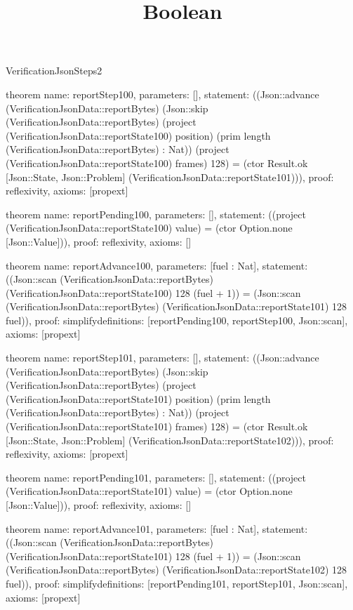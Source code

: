 \begin{lexlean}{VerificationJsonSteps2}
\title{Boolean}
\begin{semanticmodule}

theorem{
  name: reportStep100,
  parameters: [],
  statement: ((Json::advance (VerificationJsonData::reportBytes) (Json::skip (VerificationJsonData::reportBytes) (project (VerificationJsonData::reportState100) position) (prim length (VerificationJsonData::reportBytes) : Nat)) (project (VerificationJsonData::reportState100) frames) 128) = (ctor Result.ok [Json::State, Json::Problem] (VerificationJsonData::reportState101))),
  proof: reflexivity{},
  axioms: [propext]
}

theorem{
  name: reportPending100,
  parameters: [],
  statement: ((project (VerificationJsonData::reportState100) value) = (ctor Option.none [Json::Value])),
  proof: reflexivity{},
  axioms: []
}

theorem{
  name: reportAdvance100,
  parameters: [fuel : Nat],
  statement: ((Json::scan (VerificationJsonData::reportBytes) (VerificationJsonData::reportState100) 128 (fuel + 1)) = (Json::scan (VerificationJsonData::reportBytes) (VerificationJsonData::reportState101) 128 fuel)),
  proof: simplify{definitions: [reportPending100, reportStep100, Json::scan]},
  axioms: [propext]
}

theorem{
  name: reportStep101,
  parameters: [],
  statement: ((Json::advance (VerificationJsonData::reportBytes) (Json::skip (VerificationJsonData::reportBytes) (project (VerificationJsonData::reportState101) position) (prim length (VerificationJsonData::reportBytes) : Nat)) (project (VerificationJsonData::reportState101) frames) 128) = (ctor Result.ok [Json::State, Json::Problem] (VerificationJsonData::reportState102))),
  proof: reflexivity{},
  axioms: [propext]
}

theorem{
  name: reportPending101,
  parameters: [],
  statement: ((project (VerificationJsonData::reportState101) value) = (ctor Option.none [Json::Value])),
  proof: reflexivity{},
  axioms: []
}

theorem{
  name: reportAdvance101,
  parameters: [fuel : Nat],
  statement: ((Json::scan (VerificationJsonData::reportBytes) (VerificationJsonData::reportState101) 128 (fuel + 1)) = (Json::scan (VerificationJsonData::reportBytes) (VerificationJsonData::reportState102) 128 fuel)),
  proof: simplify{definitions: [reportPending101, reportStep101, Json::scan]},
  axioms: [propext]
}


\end{semanticmodule}
\end{lexlean}

